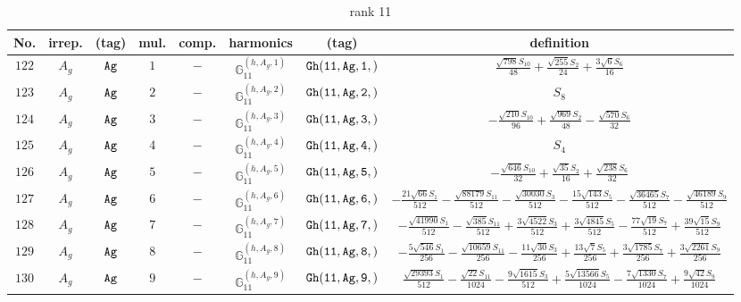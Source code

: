 \documentclass[fleqn,8pt]{jsarticle}
\begin{document}
\begin{table}[ht!]
\begin{center}
\caption{rank 11}
\renewcommand{\arraystretch}{1.3}
\begin{tabular}{cccccccc} \hline \hline
No. & irrep. & (tag) & mul. & comp. & harmonics & (tag) & definition \\ \hline
$ 122 $ & $ A_{g} $ & $ {\tt Ag} $ & $ 1 $ & $ - $ & $ \mathbb{G}_{11}^{(h,A_{g},1)} $ & $ {\tt Gh(11,Ag,1,)} $ & $ \frac{\sqrt{798} S_{10}}{48} + \frac{\sqrt{255} S_{2}}{24} + \frac{3 \sqrt{6} S_{6}}{16} $ \\
$ 123 $ & $ A_{g} $ & $ {\tt Ag} $ & $ 2 $ & $ - $ & $ \mathbb{G}_{11}^{(h,A_{g},2)} $ & $ {\tt Gh(11,Ag,2,)} $ & $ S_{8} $ \\
$ 124 $ & $ A_{g} $ & $ {\tt Ag} $ & $ 3 $ & $ - $ & $ \mathbb{G}_{11}^{(h,A_{g},3)} $ & $ {\tt Gh(11,Ag,3,)} $ & $ - \frac{\sqrt{210} S_{10}}{96} + \frac{\sqrt{969} S_{2}}{48} - \frac{\sqrt{570} S_{6}}{32} $ \\
$ 125 $ & $ A_{g} $ & $ {\tt Ag} $ & $ 4 $ & $ - $ & $ \mathbb{G}_{11}^{(h,A_{g},4)} $ & $ {\tt Gh(11,Ag,4,)} $ & $ S_{4} $ \\
$ 126 $ & $ A_{g} $ & $ {\tt Ag} $ & $ 5 $ & $ - $ & $ \mathbb{G}_{11}^{(h,A_{g},5)} $ & $ {\tt Gh(11,Ag,5,)} $ & $ - \frac{\sqrt{646} S_{10}}{32} + \frac{\sqrt{35} S_{2}}{16} + \frac{\sqrt{238} S_{6}}{32} $ \\
$ 127 $ & $ A_{g} $ & $ {\tt Ag} $ & $ 6 $ & $ - $ & $ \mathbb{G}_{11}^{(h,A_{g},6)} $ & $ {\tt Gh(11,Ag,6,)} $ & $ - \frac{21 \sqrt{66} S_{1}}{512} - \frac{\sqrt{88179} S_{11}}{512} - \frac{\sqrt{30030} S_{3}}{512} - \frac{15 \sqrt{143} S_{5}}{512} - \frac{\sqrt{36465} S_{7}}{512} - \frac{\sqrt{46189} S_{9}}{512} $ \\
$ 128 $ & $ A_{g} $ & $ {\tt Ag} $ & $ 7 $ & $ - $ & $ \mathbb{G}_{11}^{(h,A_{g},7)} $ & $ {\tt Gh(11,Ag,7,)} $ & $ - \frac{\sqrt{41990} S_{1}}{512} - \frac{\sqrt{385} S_{11}}{512} + \frac{3 \sqrt{4522} S_{3}}{512} + \frac{3 \sqrt{4845} S_{5}}{512} - \frac{77 \sqrt{19} S_{7}}{512} + \frac{39 \sqrt{15} S_{9}}{512} $ \\
$ 129 $ & $ A_{g} $ & $ {\tt Ag} $ & $ 8 $ & $ - $ & $ \mathbb{G}_{11}^{(h,A_{g},8)} $ & $ {\tt Gh(11,Ag,8,)} $ & $ - \frac{5 \sqrt{546} S_{1}}{256} - \frac{\sqrt{10659} S_{11}}{256} - \frac{11 \sqrt{30} S_{3}}{256} + \frac{13 \sqrt{7} S_{5}}{256} + \frac{3 \sqrt{1785} S_{7}}{256} + \frac{3 \sqrt{2261} S_{9}}{256} $ \\
$ 130 $ & $ A_{g} $ & $ {\tt Ag} $ & $ 9 $ & $ - $ & $ \mathbb{G}_{11}^{(h,A_{g},9)} $ & $ {\tt Gh(11,Ag,9,)} $ & $ \frac{\sqrt{29393} S_{1}}{512} - \frac{\sqrt{22} S_{11}}{1024} - \frac{9 \sqrt{1615} S_{3}}{512} + \frac{5 \sqrt{13566} S_{5}}{1024} - \frac{7 \sqrt{1330} S_{7}}{1024} + \frac{9 \sqrt{42} S_{9}}{1024} $ \\

\end{tabular}
\end{center}
\end{table}
\end{document}
